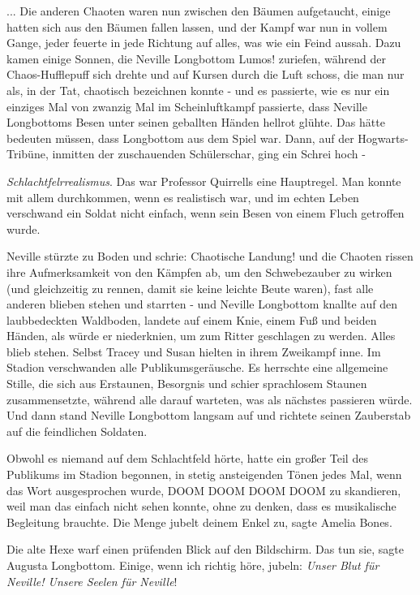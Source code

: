 ... Die anderen Chaoten waren nun zwischen den Bäumen aufgetaucht, einige hatten
sich aus den Bäumen fallen lassen, und der Kampf war nun in vollem Gange, jeder
feuerte in jede Richtung auf alles, was wie ein Feind aussah. Dazu kamen einige
Sonnen, die Neville Longbottom \glqq Lumos!\grqq{} zuriefen, während der
Chaos-Hufflepuff sich drehte und auf Kursen durch die Luft schoss, die man nur
als, in der Tat, \glqq chaotisch\grqq{} bezeichnen konnte - und es passierte,
wie es nur ein einziges Mal von zwanzig Mal im Scheinluftkampf passierte, dass
Neville Longbottoms Besen unter seinen geballten Händen hellrot glühte. Das
hätte bedeuten müssen, dass Longbottom aus dem Spiel war. Dann, auf der
Hogwarts-Tribüne, inmitten der zuschauenden Schülerschar, ging ein Schrei hoch -

\emph{Schlachtfelrrealismus}. Das war Professor Quirrells eine Hauptregel. Man
konnte mit allem durchkommen, wenn es realistisch war, und im echten Leben
verschwand ein Soldat nicht einfach, wenn sein Besen von einem Fluch getroffen
wurde.

Neville stürzte zu Boden und schrie: \glqq Chaotische Landung!\grqq{} und die
Chaoten rissen ihre Aufmerksamkeit von den Kämpfen ab, um den Schwebezauber zu
wirken (und gleichzeitig zu rennen, damit sie keine leichte Beute waren), fast
alle anderen blieben stehen und starrten - und Neville Longbottom knallte auf
den laubbedeckten Waldboden, landete auf einem Knie, einem Fuß und beiden
Händen, als würde er niederknien, um zum Ritter geschlagen zu werden. Alles
blieb stehen. Selbst Tracey und Susan hielten in ihrem Zweikampf inne. Im
Stadion verschwanden alle Publikumsgeräusche. Es herrschte eine allgemeine
Stille, die sich aus Erstaunen, Besorgnis und schier sprachlosem Staunen
zusammensetzte, während alle darauf warteten, was als nächstes passieren würde.
Und dann stand Neville Longbottom langsam auf und richtete seinen Zauberstab auf
die feindlichen Soldaten.

Obwohl es niemand auf dem Schlachtfeld hörte, hatte ein großer Teil des
Publikums im Stadion begonnen, in stetig ansteigenden Tönen jedes Mal, wenn das
Wort ausgesprochen wurde, \glqq DOOM DOOM DOOM DOOM\grqq{} zu skandieren, weil
man das einfach nicht sehen konnte, ohne zu denken, dass es musikalische
Begleitung brauchte. \glqq Die Menge jubelt deinem Enkel zu\grqq{}, sagte Amelia
Bones.

Die alte Hexe warf einen prüfenden Blick auf den Bildschirm. \glqq Das tun
sie\grqq{}, sagte Augusta Longbottom. \glqq Einige, wenn ich richtig höre,
jubeln: \emph{Unser Blut für Neville! Unsere Seelen für Neville}!\grqq{}

